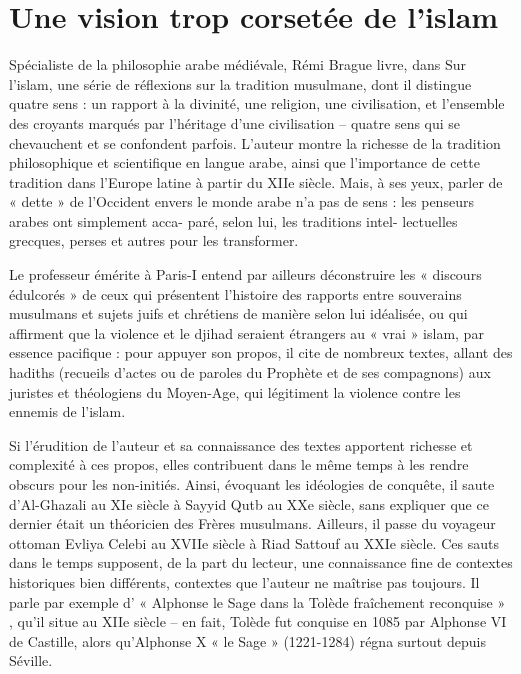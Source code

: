  
  \section{  Une vision trop corsetée de l’islam}



Spécialiste de la philosophie arabe médiévale, Rémi Brague livre, dans Sur l’islam, une
série de réflexions sur la tradition musulmane, dont il distingue quatre sens : un rapport à la divinité, une religion, une civilisation, et l’ensemble des croyants marqués par l’héritage d’une civilisation – quatre sens qui se chevauchent et se confondent parfois. L’auteur montre la richesse de la tradition philosophique et scientifique en langue arabe, ainsi que l’importance de cette tradition dans l’Europe latine à partir du XIIe siècle. Mais, à ses yeux, parler de « dette » de l’Occident envers le monde arabe n’a pas de sens : les penseurs arabes ont simplement acca- paré, selon lui, les traditions intel- lectuelles grecques, perses et autres pour les transformer.

Le professeur émérite à Paris-I entend par ailleurs déconstruire les « discours édulcorés » de ceux qui présentent l’histoire des rapports entre souverains musulmans et sujets juifs et chrétiens de manière selon lui idéalisée, ou qui affirment que la violence et le djihad seraient étrangers au « vrai » islam, par essence pacifique : pour appuyer son propos, il cite de nombreux textes, allant des hadiths (recueils d’actes ou de paroles du Prophète et de ses compagnons) aux juristes et théologiens du Moyen-Age, qui légitiment la violence contre les ennemis de l’islam.

Si l’érudition de l’auteur et sa connaissance des textes apportent richesse et complexité à ces propos, elles contribuent dans le même temps à les rendre obscurs pour les non-initiés. Ainsi, évoquant les idéologies de conquête, il saute d’Al-Ghazali au XIe siècle à Sayyid Qutb au XXe siècle, sans expliquer que ce dernier était un théoricien des Frères musulmans. Ailleurs, il passe du voyageur ottoman Evliya Celebi au XVIIe siècle à Riad Sattouf au XXIe siècle. Ces sauts dans le temps supposent, de la part du lecteur, une connaissance fine de contextes historiques bien différents, contextes que l’auteur ne maîtrise pas toujours. Il parle par exemple d’ « Alphonse le Sage dans la Tolède fraîchement reconquise » , qu’il situe au XIIe siècle – en fait, Tolède fut conquise en 1085 par Alphonse VI de Castille, alors qu’Alphonse X « le Sage
» (1221-1284) régna surtout depuis Séville.
 
